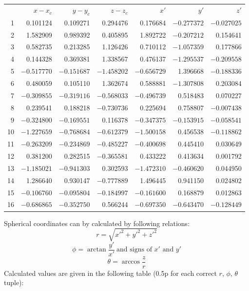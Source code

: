\begin{description}
  \begin{center}
  \begin{tabular}{rrrrrrr}
  & $x - x_c$ & $y - y_c$ & $z - z_c$ & $x'$ & $y'$ & $z'$\\
  1 & 0.101124 & 0.109271 & 0.294476 & 0.176684 & $-0.277372$ & $-0.027025$\\
  2 & 1.582909 & 0.989392 & 0.405895 & 1.892722 & $-0.207212$ & 0.154641\\
  3 & 0.582735 & 0.213285 & 1.126426 & 0.710112 & $-1.057359$ & 0.177866\\
  4 & 0.144328 & 0.369381 & 1.338567 & 0.476137 & $-1.295537$ & $-0.209558$\\
  5 & $-0.517770$ & $-0.151687$ & $-1.458202$ & $-0.656729$ & 1.396668 & $-0.188336$\\
  6 & 0.480059 & 0.105110 & 1.362674 & 0.588881 & $-1.307808$ & 0.203084\\
  7 & $-0.309855$ & $-0.319116$ & $-0.568033$ & $-0.496739$ & 0.518483 & 0.070227\\
  8 & 0.239541 & 0.188218 & $-0.730736$ & 0.225694 & 0.758807 & $-0.007438$\\
  9 & $-0.324800$ & $-0.169551$ & 0.116378 & $-0.347375$ & $-0.153915$ & $-0.058541$\\
  10 & $-1.227659$ & $-0.768684$ & $-0.612379$ & $-1.500158$ & 0.456538 & $-0.118862$\\
  11 & $-0.263209$ & $-0.234869$ & $-0.485227$ & $-0.400698$ & 0.445410 & 0.030649\\
  12 & 0.381200 & 0.282515 & $-0.365581$ & 0.433222 & 0.413634 & 0.001792\\
  13 & $-1.185021$ & $-0.941303$ & 0.302593 & $-1.472310$ & $-0.460620$ & 0.044950\\
  14 & 1.286640 & 0.930147 & $-0.777889$ & 1.496445 & 0.941150 & 0.024802\\
  15 & $-0.106760$ & $-0.095804$ & $-0.184997$ & $-0.161600$ & 0.168879 & 0.012863\\
  16 & $-0.686865$ & $-0.352750$ & 0.566244 & $-0.697350$ & $-0.643470$ & $-0.128449$
  \end{tabular}
  \end{center}

\item[(d)] Spherical coordinates can by calculated by following
  relations:
  \[ r = \sqrt{x'^2 + y'^2 + z'^2} \]
  \[ \phi = \arctan\frac{y'}{x'}\ \text{and signs of $x'$ and $y'$} \]
  \[ \theta = \arccos\frac{z}{r} \]
  Calculated values are given in the following table (0.5p for each
  correct $r$, $\phi$, $\theta$ tuple):


\end{description}

